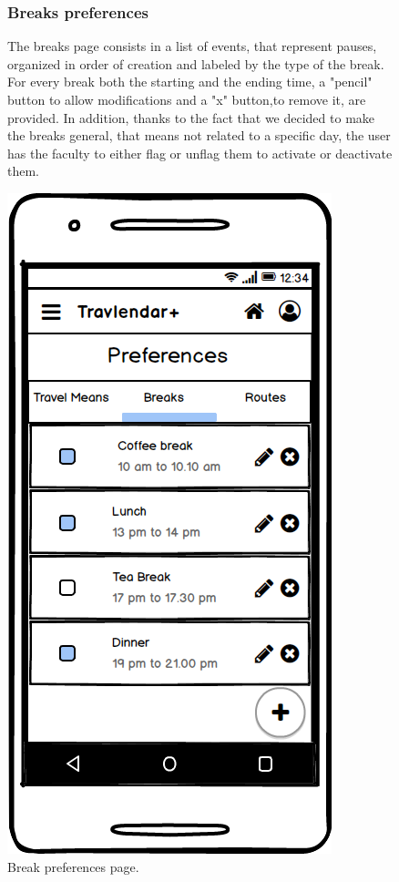 		\begin{figure}
				\begin{flushleft}
				\subsubsection{Breaks preferences}
				The breaks page consists in a list of events, that represent pauses, organized in order of creation and labeled by the type of the break. For every break  both the starting and the ending time, a "pencil" button to allow modifications and a "x" button,to remove it, are provided. In addition, thanks to the fact that we decided to make the breaks general, that means not related to a specific day, the user has the faculty to either flag or unflag them to activate or deactivate them. 
			\end{flushleft}
		\centering
		\includegraphics[width=0.6\linewidth]{mockups/PreferencesBreaks}
		\caption{Break preferences page.}
		\label{fig:preferencesbreaks}
	\end{figure}
	
